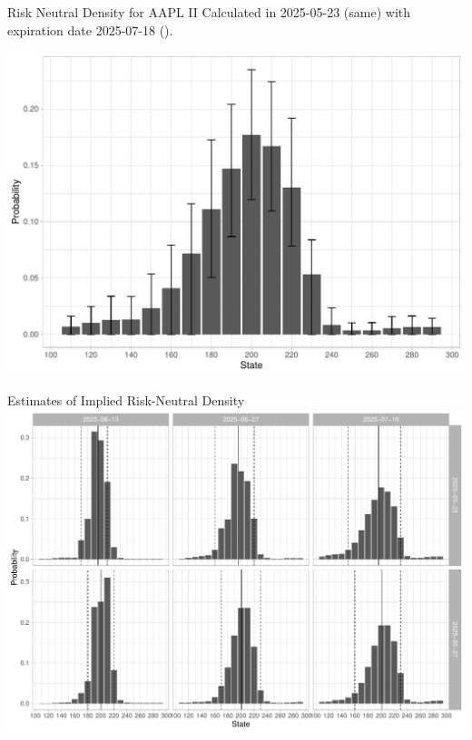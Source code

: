 \documentclass[10pt,aspectratio=43]{beamer}
\begin{document}
\begin{frame}{Risk Neutral Density for AAPL II}
    Calculated in 2025-05-23 (same) with expiration date 2025-07-18 ().
    \begin{center}
        \includegraphics[width=0.8\linewidth]{betas_23_3.pdf}
    \end{center}
    
\end{frame}

\begin{frame}{Estimates of Implied Risk-Neutral Density}\centering
    \includegraphics[width=\linewidth]{betas.pdf}
\end{frame}
 
\end{document}
